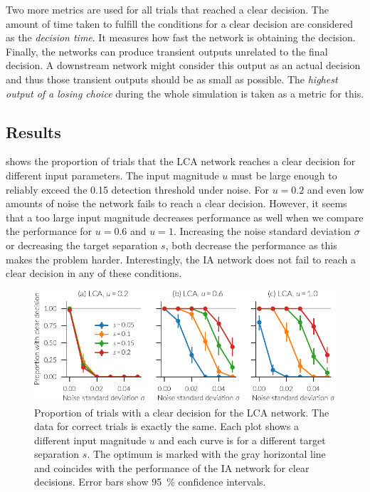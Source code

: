 Two more metrics are used for all trials that reached a clear decision.
The amount of time taken to fulfill the conditions for a clear decision are considered as the \emph{decision time}.
It measures how fast the network is obtaining the decision.
Finally, the networks can produce transient outputs unrelated to the final decision.
A downstream network might consider this output as an actual decision and thus those transient outputs should be as small as possible.
The \emph{highest output of a losing choice} during the whole simulation is taken as a metric for this.


\subsection{Results}
 shows the proportion of trials that the LCA network reaches a clear decision for different input parameters.
The input magnitude $u$ must be large enough to reliably exceed the \num{0.15} detection threshold under noise.
For $u = 0.2$ and even low amounts of noise the network fails to reach a clear decision.
However, it seems that a too large input magnitude decreases performance as well when we compare the performance for $u=0.6$ and $u=1$.
Increasing the noise standard deviation $\sigma$ or decreasing the target separation $s$, both decrease the performance as this makes the problem harder.
Interestingly, the IA network does not fail to reach a clear decision in any of these conditions.
\begin{figure}
    \centering
    \includegraphics{figures/ia-clear}
    \caption[Proportion of trials with a clear decision for the LCA network.]{Proportion of trials with a clear decision for the LCA network. The data for correct trials is exactly the same. Each plot shows a different input magnitude $u$ and each curve is for a different target separation $s$. The optimum is marked with the gray horizontal line and coincides with the performance of the IA network for clear decisions. Error bars show \SI{95}{\percent} confidence intervals.}\label{fig:ia-clear}
\end{figure}

